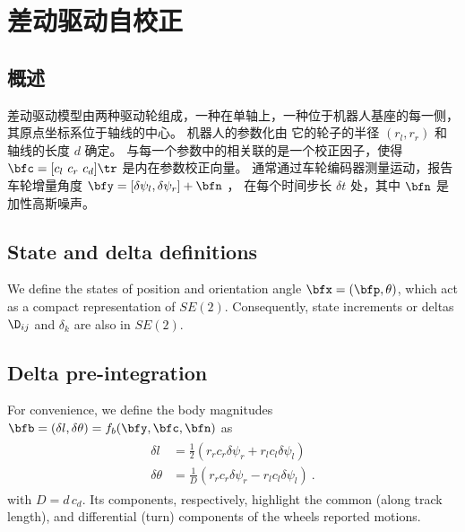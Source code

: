 
\section{差动驱动自校正}
\label{sec:diff_drive}

\subsection{概述}

差动驱动模型由两种驱动轮组成，一种在单轴上，一种位于机器人基座的每一侧，
其原点坐标系位于轴线的中心。
机器人的参数化由
它的轮子的半径 $(r_l, r_r)$ 和轴线的长度 $d$ 确定。
与每一个参数中的相关联的是一个校正因子，使得
$\bfc=[c_l~c_r~c_d]\tr$ 是内在参数校正向量。
%
通常通过车轮编码器测量运动，报告车轮增量角度 $\bfy=[\delta\psi_l, \delta\psi_r]+\bfn$ ，
在每个时间步长 $\delta t$ 处，其中 $\bfn$ 是加性高斯噪声。


\subsection{State and delta definitions}
%
We define the states of position and orientation angle
$\bfx = (\bfp,\theta)$, which act as a compact representation of $SE(2)$.
Consequently, state increments or deltas $\D_{ij}$ and $\delta_k$ are also in $SE(2)$.


%
\subsection{Delta pre-integration}

For convenience, we define the body magnitudes 
$\bfb = (\delta l,\delta \theta)=f_b(\bfy,\bfc,\bfn)$ as
%
%
\begin{align}
\label{equ:diff_drive_psis}
\begin{split}
\delta l &= \tfrac12(r_r c_r \delta\psi_r + r_l c_l\delta\psi_l)  \\
\delta \theta &= \tfrac{1}{D}(r_r c_r \delta\psi_r - r_l c_l\delta\psi_l) 
~.
\end{split}
\end{align}
%
with $D=d\,c_d$. 
Its components, respectively, highlight the common (along track length), and differential (turn) components of the wheels reported motions.

